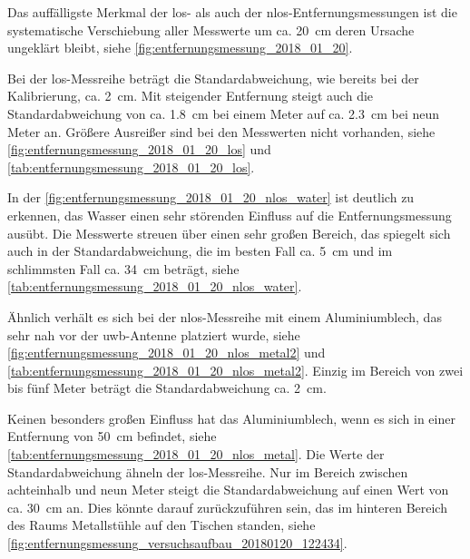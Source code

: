 Das auffälligste Merkmal der \Gls{los}- als auch der \Gls{nlos}-Entfernungsmessungen ist die systematische Verschiebung aller Messwerte um ca. \SI{20}{\centi\meter} deren Ursache ungeklärt bleibt, siehe \autoref{fig:entfernungsmessung_2018_01_20}.

Bei der \Gls{los}-Messreihe beträgt die Standardabweichung, wie bereits bei der Kalibrierung, ca. \SI{2}{\centi\meter}. Mit steigender Entfernung steigt auch die Standardabweichung von ca. \SI{1.8}{\centi\meter} bei einem Meter auf ca. \SI{2.3}{\centi\meter} bei neun Meter an. Größere Ausreißer sind bei den Messwerten nicht vorhanden, siehe \autoref{fig:entfernungsmessung_2018_01_20_los} und \autoref{tab:entfernungsmessung_2018_01_20_los}.

In der \autoref{fig:entfernungsmessung_2018_01_20_nlos_water} ist deutlich zu erkennen, das Wasser einen sehr störenden Einfluss auf die Entfernungsmessung ausübt. Die Messwerte streuen über einen sehr großen Bereich, das spiegelt sich auch in der Standardabweichung, die im besten Fall ca. \SI{5}{\centi\meter} und im schlimmsten Fall ca. \SI{34}{\centi\meter} beträgt, siehe \autoref{tab:entfernungsmessung_2018_01_20_nlos_water}.

Ähnlich verhält es sich bei der \Gls{nlos}-Messreihe mit einem Aluminiumblech, das sehr nah vor der \Gls{uwb}-Antenne platziert wurde, siehe \autoref{fig:entfernungsmessung_2018_01_20_nlos_metal2} und \autoref{tab:entfernungsmessung_2018_01_20_nlos_metal2}. Einzig im Bereich von zwei bis fünf Meter beträgt die Standardabweichung ca. \SI{2}{\centi\meter}.

Keinen besonders großen Einfluss hat das Aluminiumblech, wenn es sich in einer Entfernung von \SI{50}{\centi\meter} befindet, siehe \autoref{tab:entfernungsmessung_2018_01_20_nlos_metal}. Die Werte der Standardabweichung ähneln der \Gls{los}-Messreihe. Nur im Bereich zwischen achteinhalb und neun Meter steigt die Standardabweichung auf einen Wert von ca. \SI{30}{\centi\meter} an. Dies könnte darauf zurückzuführen sein, das im hinteren Bereich des Raums Metallstühle auf den Tischen standen, siehe \autoref{fig:entfernungsmessung_versuchsaufbau_20180120_122434}.


